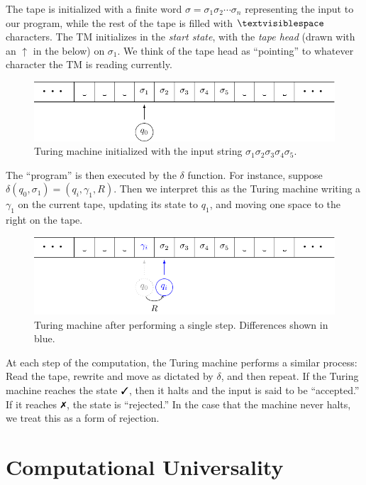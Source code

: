 \documentclass{fkpaper}
\newcommand{\blank}{\textvisiblespace}
\begin{document}
\begin{multicols}{2}
The tape is initialized with a finite word $\sigma = \sigma_1 \sigma_2
\cdots \sigma_n$ representing the input to our program, while the rest
of the tape is filled with $\blank$ characters. The TM initializes in
the \emph{start state}, with the \emph{tape head} (drawn with an
$\uparrow$ in the below) on $\sigma_1$. We think of the tape head as
``pointing'' to whatever character the TM is reading currently.
\begin{figure}[H]
  \centering
  \includegraphics[scale=.7]{figures/tm-initial-input.pdf}
  \caption{Turing machine initialized with the input string $\sigma_1
    \sigma_2 \sigma_3 \sigma_4 \sigma_5$.}
\end{figure}
The ``program'' is then executed by the $\delta$ function. For
instance, suppose $\delta(q_0, \sigma_1) = (q_i, \gamma_1, R)$. Then
we interpret this as the Turing machine writing a $\gamma_1$ on the
current tape, updating its state to $q_1$, and moving one space to the
right on the tape.
\begin{figure}[H]
  \centering
  \includegraphics{figures/tm-one-step-later.pdf}
  \caption{Turing machine after performing a single step. Differences
    shown in {\color{blue} blue}.}
\end{figure}
At each step of the computation, the Turing machine performs a similar
process: Read the tape, rewrite and move as dictated by $\delta$, and
then repeat. If the Turing machine reaches the state $\cmark$, then it
halts and the input is said to be ``accepted.'' If it reaches
$\xmark$, the state is ``rejected.'' {\color{blue} In the case that
  the machine never halts, we treat this as a form of rejection.}



\section{Computational Universality}


\end{multicols}
\end{document}
